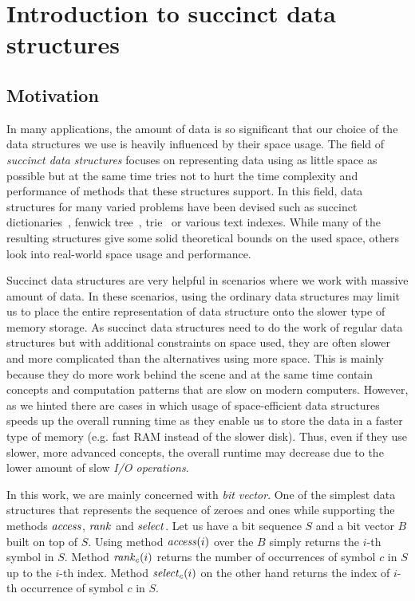 \chapter{Introduction to succinct data structures}
\label{kap:kap1}


\section{Motivation}

In many applications, the amount of data is so significant that our choice of
the data structures we use is heavily influenced by their space usage. The field
of \textit{succinct data structures} focuses on representing data using as little
space as possible but at the same time tries not to hurt the time complexity and
performance of methods that these structures support. In this field, data structures for many
varied problems have been devised such as succinct dictionaries~\citep{raman2007succinct},
fenwick tree~\citep{bille2017succinct}, trie~\citep{grossi2015fast} or various text indexes.
While many of the resulting structures give some solid theoretical bounds on the used space,
others look into real-world space usage and performance.

Succinct data structures are very helpful in scenarios where we work with massive
amount of data. In these scenarios, using the ordinary data structures may limit us to place
the entire representation of data structure onto the slower type of memory storage. As succinct
data structures need to do the work of regular data structures but with additional constraints
on space used, they are often slower and more complicated than the alternatives using more
space. This is mainly because they do more work behind the scene and at the same time contain
concepts and computation patterns that are slow on modern computers. However, as we hinted
there are cases in which usage of space-efficient data structures speeds up the overall
running time as they enable us to store the data in a faster type of memory (e.g. fast RAM
instead of the slower disk). Thus, even if they use slower, more advanced concepts, the overall
runtime may decrease due to the lower amount of slow \textit{I/O operations}.

In this work, we are mainly concerned with \textit{bit vector}. One of the simplest
data structures that represents the sequence of zeroes and ones while supporting the
methods $\mathit{access}$, $\mathit{rank}$ and $\mathit{select}$. Let us have a bit sequence $S$ and a bit
vector $B$ built on top of $S$. Using method $\mathit{access}(i)$ over the $B$ simply returns
the $i$-th symbol in $S$. Method $\mathit{rank}_c(i)$ returns the number of occurrences of
symbol $c$ in $S$ up to the $i$-th index. Method $\mathit{select}_c(i)$ on the other hand
returns the index of $i$-th occurrence of symbol $c$ in $S$.

